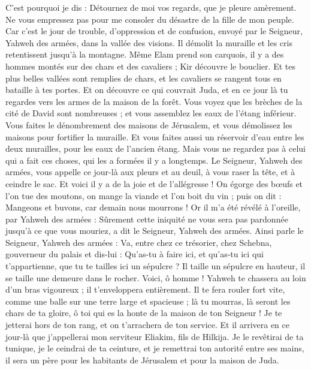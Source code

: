 \begin{multicols}{2}
C'est pourquoi je dis : Détournez de moi vos regards, que je pleure amèrement. Ne vous empressez pas pour me consoler du désastre de la fille de mon peuple.
Car c'est le jour de trouble, d'oppression et de confusion, envoyé par le Seigneur, Yahweh des armées, dans la vallée des visions. Il démolit la muraille et les cris retentissent jusqu'à la montagne.
Même Elam prend son carquois, il y a des hommes montés sur des chars et des cavaliers ; Kir découvre le bouclier.
Et tes plus belles vallées sont remplies de chars, et les cavaliers se rangent tous en bataille à tes portes.
Et on découvre ce qui couvrait Juda, et en ce jour là tu regardes vers les armes de la maison de la forêt.
Vous voyez que les brèches de la cité de David sont nombreuses ; et vous assemblez les eaux de l'étang inférieur.
Vous faites le dénombrement des maisons de Jérusalem, et vous démolissez les maisons pour fortifier la muraille.
Et vous faites aussi un réservoir d'eau entre les deux murailles, pour les eaux de l'ancien étang. Mais vous ne regardez pas à celui qui a fait ces choses, qui les a formées il y a longtemps.
Le Seigneur, Yahweh des armées, vous appelle ce jour-là aux pleurs et au deuil, à vous raser la tête, et à ceindre le sac.
Et voici il y a de la joie et de l'allégresse ! On égorge des bœufs et l'on tue des moutons, on mange la viande et l'on boit du vin ; puis on dit : Mangeons et buvons, car demain nous mourrons !
Or il m'a été révélé à l'oreille, par Yahweh des armées : Sûrement cette iniquité ne vous sera pas pardonnée jusqu'à ce que vous mouriez, a dit le Seigneur, Yahweh des armées.
Ainsi parle le Seigneur, Yahweh des armées : Va, entre chez ce trésorier, chez Schebna, gouverneur du palais et dis-lui :
Qu'as-tu à faire ici, et qu'as-tu ici qui t'appartienne, que tu te tailles ici un sépulcre ? Il taille un sépulcre en hauteur, il se taille une demeure dans le rocher.
Voici, ô homme ! Yahweh te chassera au loin d'un bras vigoureux ; il t'enveloppera entièrement.
Il te fera rouler fort vite, comme une balle sur une terre large et spacieuse ; là tu mourras, là seront les chars de ta gloire, ô toi qui es la honte de la maison de ton Seigneur !
Je te jetterai hors de ton rang, et on t'arrachera de ton service.
Et il arrivera en ce jour-là que j'appellerai mon serviteur Eliakim, fils de Hilkija.
Je le revêtirai de ta tunique, je le ceindrai de ta ceinture, et je remettrai ton autorité entre ses mains, il sera un père pour les habitants de Jérusalem et pour la maison de Juda.

\end{multicols}
